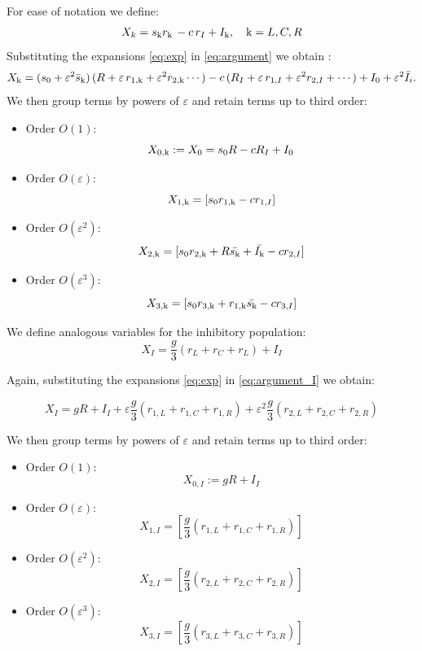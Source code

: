 \documentclass[../main.tex]{subfiles}
\begin{document}
For ease of notation we define:
\begin{equation}
  X_k = s_{\mathrm{k}} r_{\mathrm{k}} \, - c\,r_I + I_{\mathrm{k}} , \quad \mathrm{k}  = L,C,R
  \label{eq:argument}
\end{equation}
Substituting the expansions \eqref{eq:exp} in \eqref{eq:argument} we obtain :
\[
X_{\mathrm{k}}  = (s_0+ \varepsilon^2 \bar{s}_{\mathrm{k}} )\,(R + \varepsilon\,r_{1,\mathrm{k} } +\varepsilon^2 r_{2,\mathrm{k} } \cdots) - c\,(R_I + \varepsilon\,r_{1,I}+\varepsilon^2 r_{2,I} +\cdots) + I_0 +\varepsilon^2 \bar{I}_i .
\]
We then group terms by powers of $\varepsilon$ and retain terms up to third order:
\begin{itemize}
  \item Order \(O(1)\):
    \[
X_{0,\mathrm{k} } := X_{0} = s_0 R - c R_I +I_0
    \]
  \item Order \(O(\varepsilon)\):
    \[
   X_{1,\mathrm{k} } =[s_0 r_{1,\mathrm{k} }- cr_{1,I}]
    \]
  \item Order \(O(\varepsilon^2)\): 
\[
X_{2,\mathrm{k} } =  [s_0 r_{2,\mathrm{k} }+ R\bar{s_{\mathrm{k}} } + \bar{I_{\mathrm{k}} } - cr_{2,I}]
\]
  \item Order \(O(\varepsilon^3)\): 
\[
X_{3,\mathrm{k} } =  [s_0 r_{3,\mathrm{k} }+ r_{1,\mathrm{k} }\bar{s_{\mathrm{k}} }-cr_{3,I}]
\]
\end{itemize}


We define analogous variables for the inhibitory population:
\begin{equation}
  X_I = \frac g3 (r_L+r_C+r_L)+I_I
  \label{eq:argument_I}
\end{equation}

Again, substituting the expansions \eqref{eq:exp} in \eqref{eq:argument_I} we obtain:

\[
  X_I = gR+I_I + \varepsilon\frac g3 (r_{1,L}+ r_{1,C}+r_{1,R}) + \varepsilon^2 \frac g3 (r_{2,L} + r_{2,C}+ r_{2,R})
  \label{eq:argument_I_exp}
\]

We then group terms by powers of $\varepsilon$ and retain terms up to third order:

\begin{itemize}
  \item Order \(O(1)\):
    \[
X_{0,I} := gR+ I_I 
    \]
  \item Order \(O(\varepsilon)\):
    \[
   X_{1, I} =[\frac g3(r_{1,L}+ r_{1,C}+r_{1,R})]
    \]
  \item Order \(O(\varepsilon^2)\): 
\[
   X_{2, I} =[\frac g3(r_{2,L}+ r_{2,C}+r_{2,R})]
\]
  \item Order \(O(\varepsilon^3)\): 
\[
X_{3,I} =  [\frac g3(r_{3,L}+ r_{3,C}+r_{3,R})]
\]
\end{itemize}
\end{document}
